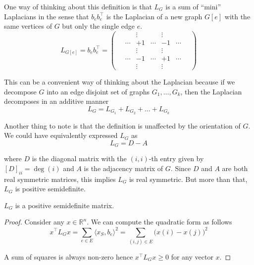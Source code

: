 One way of thinking about this definition is that $L_G$ is a sum of ``mini'' Laplacians in the sense that $b_e b_e^\top$ is the Laplacian of a new graph $G[e]$ with the same vertices of $G$ but only the single edge $e$.
\begin{equation*}
L_{G[e]}
= b_e b_e^\top
= \begin{pmatrix}
  & \vdots & & \vdots & \\
  \quad\cdots & +1 & \cdots & -1 & \cdots\quad \\
  & \vdots & & \vdots & \\
  \quad\cdots & -1 & \cdots & +1 & \cdots\quad \\
  & \vdots & & \vdots &
\end{pmatrix}
\end{equation*}

This can be a convenient way of thinking about the Laplacian because if we decompose $G$ into an edge disjoint set of graphs $G_1, \ldots, G_k$, then the Laplacian decomposes in an additive manner
\begin{equation*}
L_G = L_{G_1} + L_{G_2} + \ldots + L_{G_k}
\end{equation*} 

Another thing to note is that the definition is unaffected by the orientation of $G$. We could have equivalently expressed $L_G$ as 
\begin{equation*}
L_G = D - A
\end{equation*}

where $D$ is the diagonal matrix with the $(i, i)$-th entry given by $[D]_{ii} = \deg(i)$ and $A$ is the adjacency matrix of $G$. Since $D$ and $A$ are both real symmetric matrices, this implies $L_G$ is real symmetric. But more than that, $L_G$ is positive semidefinite.
\begin{claim}
$L_G$ is a positive semidefinite matrix.
\end{claim}
\begin{proof}
Consider any $x \in \mathbb{R}^n$. We can compute the quadratic form as follows
\begin{equation*}
x^\top L_G x 
= \sum_{e \in E} \langle x_S, b_e \rangle^2 
= \sum_{(i, j) \in E} \big( x(i) - x(j) \big)^2 
\end{equation*}

A sum of squares is always non-zero hence $x^\top L_G x \geq 0$ for any vector $x$.
\end{proof}



